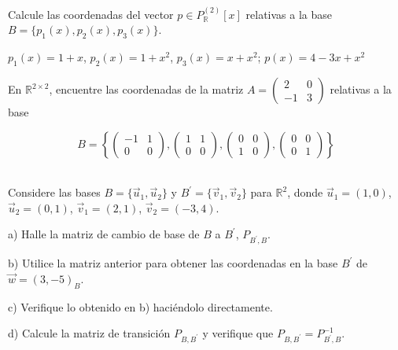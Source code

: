 \begin{exercise}
\item

Calcule las coordenadas del vector $p \in P^{(2)}_{\mathbb{R}}[x]$ relativas a la base $B=\{
p_1(x),p_2(x),p_3(x)\}$.



$p_1(x)=1+x$, $p_2(x)=1+x^2$, $p_3(x)=x+x^2$; $p(x)=4-3x+x^2$\\
\end{exercise}
\begin{exercise}
\item
En $\mathbb{R}^{2\times2}$, encuentre las coordenadas de la matriz
$A=\left(\begin{array}{cc}2 & 0  \\-1 & 3
\end{array}
 \right)$ relativas a la base


\[ B= \left\{
 \left(\begin{array}{cc}-1 & 1  \\0 & 0
\end{array}
 \right),\left(\begin{array}{cc}1 & 1  \\0 & 0
\end{array}
 \right),\left(\begin{array}{cc}0 & 0  \\1 & 0
\end{array}
 \right),\left(\begin{array}{cc}0 & 0  \\0 & 1
\end{array}
 \right)
 \right \}
 \]\\
\end{exercise}
\begin{exercise}
\item 


Considere las bases $B=\{ \vec{u}_1,\vec{u}_2\}$  y $B^\prime=\{ \vec{v}_1,\vec{v}_2\}$ para
$ \mathbb{R}^2$, donde  $\vec{u}_1=(1,0)$, $\vec{u}_2=(0,1)$, $\vec{v}_1=(2,1)$,
$\vec{v}_2=(-3,4)$.

a) Halle la matriz de cambio de base de $B$ a $B^\prime$, $P_{B^\prime,B}$.

b) Utilice la matriz anterior para obtener las coordenadas en la base
$B^\prime$ de $\vec{w}=(3, -5)_{B}$.

c) Verifique lo obtenido en b) haciéndolo directamente.

d) Calcule la matriz de transición $P_{B,B^\prime}$ y verifique que
$P_{B,B^\prime}= P^{-1}_{B^\prime,B}$.
\end{exercise}

